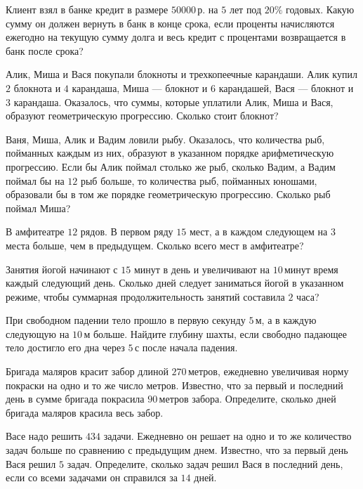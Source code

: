 \begin{class}[number=1]
\begin{listofex}
			\item Клиент взял в банке кредит в размере \( 50 000 \) р. на \( 5 \) лет под \( 20\% \) годовых. Какую сумму он должен вернуть в банк в конце срока, если проценты начисляются ежегодно на текущую сумму долга и весь кредит с процентами возвращается в банк после срока?
			\item Алик, Миша и Вася покупали блокноты и трехкопеечные карандаши. Алик купил \( 2 \) блокнота и \( 4 \) карандаша, Миша --- блокнот и \( 6 \) карандашей, Вася --- блокнот и \( 3 \) карандаша. Оказалось, что суммы, которые уплатили Алик, Миша и Вася, образуют геометрическую прогрессию. Сколько стоит блокнот?
			\item Ваня, Миша, Алик и Вадим ловили рыбу. Оказалось, что количества рыб, пойманных каждым из них, образуют в указанном порядке арифметическую прогрессию. Если бы Алик поймал столько же рыб, сколько Вадим, а Вадим поймал бы на \( 12 \) рыб больше, то количества рыб, пойманных юношами, образовали бы в том же порядке геометрическую прогрессию. Сколько рыб поймал Миша?
			\item В амфитеатре \( 12 \) рядов. В первом ряду \( 15 \) мест, а в каждом следующем на \( 3 \) места больше, чем в предыдущем. Сколько всего мест в амфитеатре?
			\item Занятия йогой начинают с \( 15 \) минут в день и увеличивают на \( 10 \) минут время каждый следующий день. Сколько дней следует заниматься йогой в указанном режиме, чтобы суммарная продолжительность занятий составила \( 2 \) часа?
			\item При свободном падении тело прошло в первую секунду \( 5 \) м, а в каждую следующую на \( 10 \) м больше. Найдите глубину шахты, если свободно падающее тело достигло его дна через \( 5 \) с после начала падения.
			\item Бригада маляров красит забор длиной \( 270 \) метров, ежедневно увеличивая норму покраски на одно и то же число метров. Известно, что за первый и последний день в сумме бригада покрасила \( 90 \) метров забора. Определите, сколько дней бригада маляров красила весь забор.
			\item Васе надо решить \( 434 \) задачи. Ежедневно он решает на одно и то же количество задач больше по сравнению с предыдущим днем. Известно, что за первый день Вася решил \( 5 \) задач. Определите, сколько задач решил Вася в последний день, если со всеми задачами он справился за \( 14 \) дней.
	\end{listofex}
\end{class}

